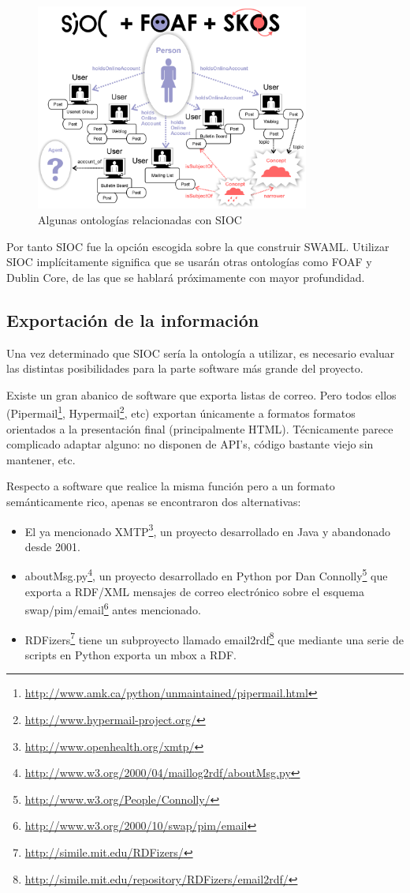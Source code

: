 \begin{figure}[H]
	\centering
	\includegraphics[width=9cm]{images/sioc-foaf-skos.png}
	\caption{Algunas ontologías relacionadas con SIOC}
	\label{fig:sioc+foaf+skos}
\end{figure}

Por tanto SIOC fue la opción escogida sobre la que construir SWAML. Utilizar SIOC
implícitamente significa que se usarán otras ontologías como FOAF y Dublin Core,
de las que se hablará próximamente con mayor profundidad.


\subsection{Exportación de la información}

Una vez determinado que SIOC sería la ontología a utilizar, es necesario evaluar
las distintas posibilidades para la parte software más grande del proyecto.

Existe un gran abanico de software que exporta listas de correo. Pero todos
ellos (Pipermail\footnote{\url{http://www.amk.ca/python/unmaintained/pipermail.html}},
Hypermail\footnote{\url{http://www.hypermail-project.org/}}, etc) exportan únicamente
a formatos formatos orientados a la presentación final (principalmente HTML). 
Técnicamente parece complicado adaptar alguno: no disponen de API's, código bastante
viejo sin mantener, etc.

Respecto a software que realice la misma función pero a un formato semánticamente 
rico, apenas se encontraron dos alternativas:

\begin{itemize}
  \item El ya mencionado XMTP\footnote{\url{http://www.openhealth.org/xmtp/}}, un
	proyecto desarrollado en Java y abandonado desde 2001.
  \item aboutMsg.py\footnote{\url{http://www.w3.org/2000/04/maillog2rdf/aboutMsg.py}}, un
	proyecto desarrollado en Python por Dan Connolly\footnote{\url{http://www.w3.org/People/Connolly/}}
	que exporta a RDF/XML mensajes de correo electrónico sobre el esquema 
	swap/pim/email\footnote{\url{http://www.w3.org/2000/10/swap/pim/email}}
	antes mencionado.
  \item RDFizers\footnote{\url{http://simile.mit.edu/RDFizers/}} tiene un subproyecto
	llamado email2rdf\footnote{\url{http://simile.mit.edu/repository/RDFizers/email2rdf/}}
	que mediante una serie de scripts en Python exporta un mbox a RDF.
\end{itemize}

